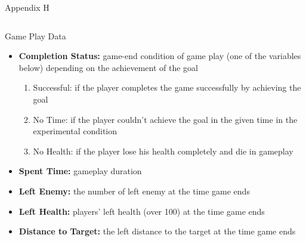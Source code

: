 \documentclass{beamer}
\begin{document}
\begin{frame}[label=appH, plain]{Appendix H}
 \fontsize{10pt}{10}\selectfont
  \begin{columns}[t]
    \begin{exampleblock}{Game Play Data}

 \begin{itemize}
 
 \item \textbf{Completion Status:} game-end condition of game play (one of the variables below) depending on the achievement of the goal
 \begin{enumerate}
 	\item \alert{Successful}: if the player completes the game successfully by achieving the goal
 	\item \alert{No Time}: if the player couldn't achieve the goal in the given time in the experimental condition
 	\item \alert{No Health}: if the player lose his health completely and die in gameplay
 \end{enumerate}
\item \textbf{Spent Time:} gameplay duration
\item \textbf{Left Enemy:} the number of left enemy at the time game ends
\item \textbf{Left Health:} players' left health (over 100) at the time game ends
\item \textbf{Distance to Target:} the left distance to the target at the time game ends

\end{itemize}
    \end{exampleblock}
  \end{columns}  
\end{frame}
\end{document}
